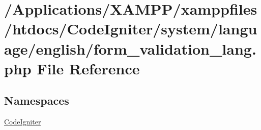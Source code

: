 \hypertarget{form__validation__lang_8php}{}\section{/\+Applications/\+X\+A\+M\+P\+P/xamppfiles/htdocs/\+Code\+Igniter/system/language/english/form\+\_\+validation\+\_\+lang.php File Reference}
\label{form__validation__lang_8php}
\subsection*{Namespaces}
\begin{DoxyCompactItemize}
\item 
 \mbox{\hyperlink{namespace_code_igniter}{Code\+Igniter}}
\end{DoxyCompactItemize}
